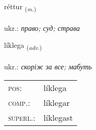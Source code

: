 \documentclass[frontgrid, backgrid]{flacards}\usepackage[]{graphicx}\usepackage[]{xcolor}
\begin{document}
\renewcommand{\flhead}{\vskip5pt \fboxsep=0pt {\small\bfseries\footnotesize Nafnorð | іменник}}
\renewcommand{\fcfoot}{\vskip5pt \fboxsep=0pt \hspace{2pt}{\small\bfseries\footnotesize 1K}}

\renewcommand{\blhead}{\vskip5pt {\small\bfseries\footnotesize Nafnorð | іменник }}
\renewcommand{\bcfoot}{\vskip5pt \hspace{2pt}{\small\bfseries\footnotesize 1K}}


{réttur \small{\textsubscript{(\textit{m.})}} \\[1ex] %
\textphonetic{[rjɛhtʏr]} \\
ukr.: \emph{право; суд; страва} \\  [2ex]
\renewcommand*{\arraystretch}{0.8}
}

\renewcommand{\flhead}{\vskip5pt \fboxsep=0pt {\small\bfseries\footnotesize Atviksorð | прислівник}}
\renewcommand{\fcfoot}{\vskip5pt \fboxsep=0pt \hspace{2pt}{\small\bfseries\footnotesize 1K}}

\renewcommand{\blhead}{\vskip5pt {\small\bfseries\footnotesize Atviksorð | прислівник }}
\renewcommand{\bcfoot}{\vskip5pt \hspace{2pt}{\small\bfseries\footnotesize 1K}}


{líklega \small{\textsubscript{(\textit{adv.})}} \\[1ex] %
\textphonetic{[lihklɛɣa]} \\
ukr.: \emph{скоріж за все; мабуть} \\  [2ex]
\renewcommand*{\arraystretch}{0.8}
\begin{tabular}{ll}
\textsc{pos}: & líklega \\ 
\textsc{comp.}: & líklegar \\ 
\textsc{superl.}: & líklegast \\
\end{tabular}
}
\end{document}
